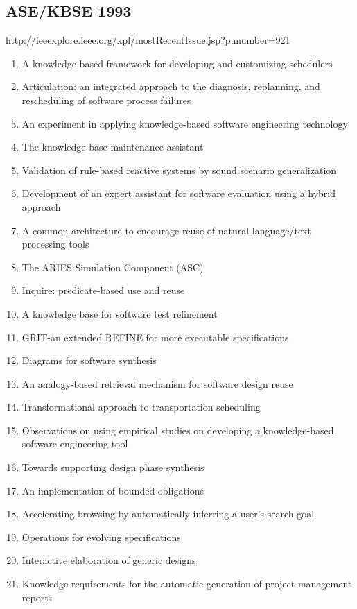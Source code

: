 \subsection{ASE/KBSE 1993}

http://ieeexplore.ieee.org/xpl/mostRecentIssue.jsp?punumber=921

\begin{enumerate}[itemsep=-1ex]
  \item A knowledge based framework for developing and customizing schedulers
  \item Articulation: an integrated approach to the diagnosis, replanning, and rescheduling of software process failures
  \item An experiment in applying knowledge-based software engineering technology
  \item The knowledge base maintenance assistant
  \item Validation of rule-based reactive systems by sound scenario generalization
  \item Development of an expert assistant for software evaluation using a hybrid approach
  \item A common architecture to encourage reuse of natural language/text processing tools
  \item The ARIES Simulation Component (ASC)
  \item Inquire: predicate-based use and reuse
  \item A knowledge base for software test refinement
  \item GRIT-an extended REFINE for more executable specifications
  \item Diagrams for software synthesis
  \item An analogy-based retrieval mechanism for software design reuse
  \item Transformational approach to transportation scheduling
  \item Observations on using empirical studies on developing a knowledge-based software engineering tool
  \item Towards supporting design phase synthesis
  \item An implementation of bounded obligations
  \item Accelerating browsing by automatically inferring a user's search goal
  \item Operations for evolving specifications
  \item Interactive elaboration of generic designs
  \item Knowledge requirements for the automatic generation of project management reports
\end{enumerate}

